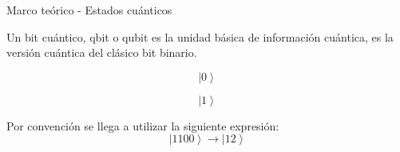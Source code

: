 \begin{frame}{Marco teórico - Estados cuánticos}
\begin{defi}
Un bit cuántico, qbit o qubit es la unidad básica de información cuántica, es la
versión cuántica del clásico bit binario.
\end{defi}
\begin{minipage}{0.4\linewidth}
\begin{equation*}
\left| 0\right\rangle    
\end{equation*}
\end{minipage}
\begin{minipage}{0.4\linewidth}
\begin{equation*}
\left| 1\right\rangle    
\end{equation*}
\end{minipage}
Por convención se llega a utilizar la siguiente expresión:
\begin{equation*}
\left| 1100\right\rangle    \rightarrow \left|12 \right\rangle
\end{equation*}
\end{frame}

